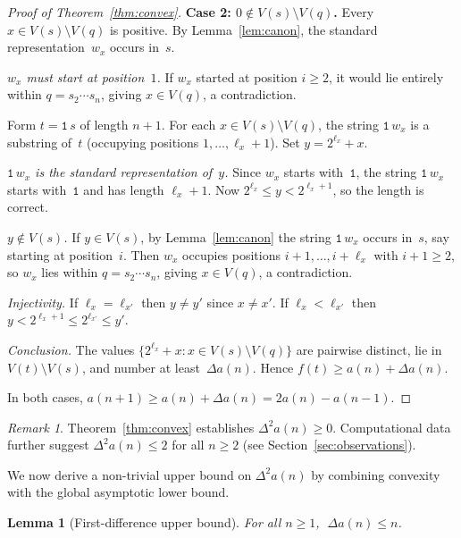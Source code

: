 \documentclass[11pt,a4paper]{article}
\theoremstyle{plain}
\newtheorem{lemma}[theorem]{Lemma}
\theoremstyle{definition}
\theoremstyle{remark}
\newtheorem{remark}[theorem]{Remark}
\newcommand{\Da}{\Delta a}
\newcommand{\DDa}{\Delta^2 a}
\begin{document}
\begin{proof}[Proof of Theorem~\ref{thm:convex}]
  \medskip
  \noindent\textbf{Case 2: $0 \notin V(s) \setminus V(q)$.}
  Every $x \in V(s) \setminus V(q)$ is positive.  By
  Lemma~\ref{lem:canon}, the standard representation~$w_x$ occurs
  in~$s$.

  \textit{$w_x$ must start at position~$1$.}
  If $w_x$ started at position $i \ge 2$, it would lie entirely
  within $q = s_2 \cdots s_n$, giving $x \in V(q)$, a contradiction.

  Form $t = \mathtt{1}\,s$ of length $n + 1$.  For each
  $x \in V(s) \setminus V(q)$, the string $\mathtt{1}\,w_x$ is a
  substring of~$t$ (occupying positions $1, \ldots, \ell_x + 1$).
  Set $y = 2^{\ell_x} + x$.

  \textit{$\mathtt{1}\,w_x$ is the standard representation of~$y$.}
  Since $w_x$ starts with~$\mathtt{1}$, the string
  $\mathtt{1}\,w_x$ starts with~$\mathtt{1}$ and has length
  $\ell_x + 1$.  Now
  $2^{\ell_x} \le y < 2^{\ell_x + 1}$, so the length is correct.

  \textit{$y \notin V(s)$.}  If $y \in V(s)$, by
  Lemma~\ref{lem:canon} the string $\mathtt{1}\,w_x$ occurs in~$s$,
  say starting at position~$i$.  Then $w_x$ occupies positions
  $i+1, \ldots, i + \ell_x$ with $i + 1 \ge 2$, so $w_x$ lies
  within $q = s_2 \cdots s_n$, giving $x \in V(q)$, a contradiction.

  \textit{Injectivity.}  If $\ell_x = \ell_{x'}$ then
  $y \ne y'$ since $x \ne x'$.  If $\ell_x < \ell_{x'}$ then
  $y < 2^{\ell_x + 1} \le 2^{\ell_{x'}} \le y'$.

  \textit{Conclusion.}  The values
  $\{2^{\ell_x} + x : x \in V(s) \setminus V(q)\}$ are pairwise
  distinct, lie in $V(t) \setminus V(s)$, and number at
  least~$\Da(n)$.
  Hence $f(t) \ge a(n) + \Da(n)$.

  \medskip
  In both cases,
  $a(n{+}1) \ge a(n) + \Da(n) = 2a(n) - a(n{-}1)$.
\end{proof}

\begin{remark}\label{rem:convex-upper}
  Theorem~\ref{thm:convex} establishes $\DDa(n) \ge 0$.
  Computational data further suggest $\DDa(n) \le 2$ for all
  $n \ge 2$ (see Section~\ref{sec:observations}).
\end{remark}

We now derive a non-trivial upper bound on $\DDa(n)$ by combining
convexity with the global asymptotic lower bound.

\begin{lemma}[First-difference upper bound]\label{lem:da-upper}
  For all $n \ge 1$, $\;\Da(n) \le n$.
\end{lemma}
\end{document}
